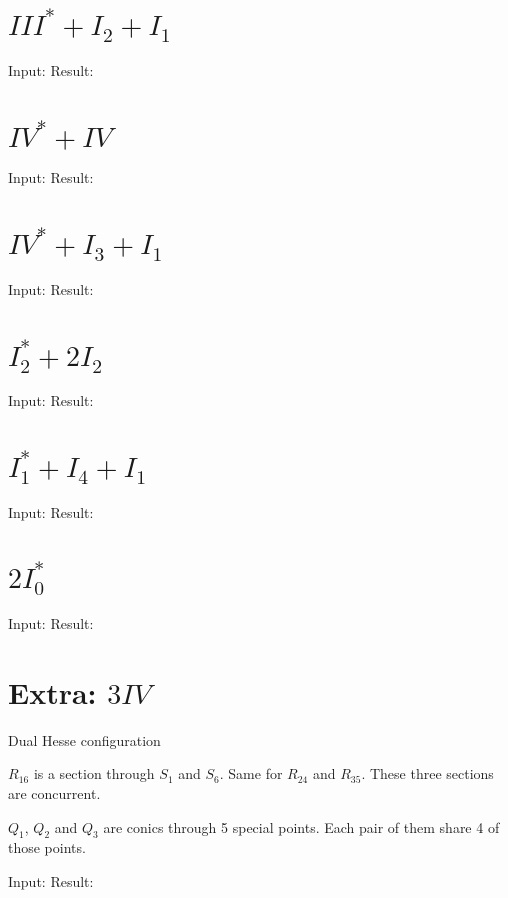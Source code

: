 \documentclass{article}
\begin{document}
\section{$III^* + I_2 + I_1$}
Input:
%
Result:
%



\section{$IV^* + IV$}
Input:
%
Result:
%


\section{$IV^* + I_3 + I_1$}
Input:
%
Result:
%

\section{$I_2^* + 2I_2$}
Input:
%
Result:
%

\section{$I_1^* + I_4 + I_1$}
Input:
%
Result:
%

\section{$2I_0^*$}
Input:
%
Result:
%


\section{Extra: $3IV$}

Dual Hesse configuration

$R_{16}$ is a section through $S_1$ and $S_6$. Same for $R_{24}$ and $R_{35}$. These three sections are concurrent.

$Q_1$, $Q_2$ and $Q_3$ are conics through 5 special points. Each pair of them share 4 of those points.


Input:
%
Result:
%
\end{document}
